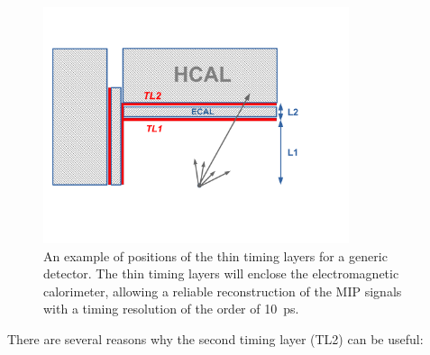 \documentclass[final,1p,11pt]{elsarticle}
\begin{document}
\begin{figure}
\begin{center}
   \includegraphics[width=0.8\textwidth]{timing_layer.pdf}\hfill
\end{center}
\caption{An example of positions of the thin timing layers for a generic detector. The thin timing layers  will enclose the electromagnetic calorimeter, allowing 
a reliable reconstruction of the  MIP signals with a timing resolution of the order of 10~ps.}
\label{fig:eff_rad}
\end{figure}


There are several reasons why the second timing layer (TL2) can be useful:
\end{document}
